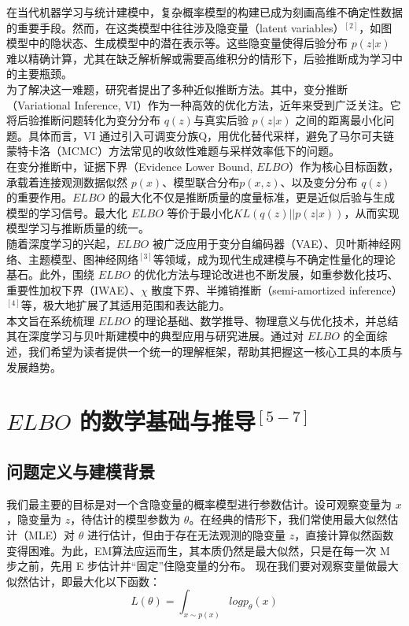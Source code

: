 \documentclass[final]{ws-ijseke}
\begin{document}
\hspace*{2em} 在当代机器学习与统计建模中，复杂概率模型的构建已成为刻画高维不确定性数据的重要手段。然而，在这类模型中往往涉及隐变量（latent variables）$^{[2]}$，如图模型中的隐状态、生成模型中的潜在表示等。这些隐变量使得后验分布 $p(z|x)$ 难以精确计算，尤其在缺乏解析解或需要高维积分的情形下，后验推断成为学习中的主要瓶颈。\\
\hspace*{2em} 为了解决这一难题，研究者提出了多种近似推断方法。其中，变分推断（Variational Inference, VI）作为一种高效的优化方法，近年来受到广泛关注。它将后验推断问题转化为变分分布 $q(z)$与真实后验 $p(z|x)$ 之间的距离最小化问题。具体而言，VI 通过引入可调变分族Q，用优化替代采样，避免了马尔可夫链蒙特卡洛（MCMC）方法常见的收敛性难题与采样效率低下的问题。\\
在变分推断中，证据下界（Evidence Lower Bound, $ELBO$）作为核心目标函数，承载着连接观测数据似然 $p(x)$、模型联合分布$p(x,z)$、以及变分分布 $q(z)$ 的重要作用。$ELBO$ 的最大化不仅是推断质量的度量标准，更是近似后验与生成模型的学习信号。最大化 $ELBO$ 等价于最小化$KL(q(z)||p(z|x))$，从而实现模型学习与推断质量的统一。\\
\hspace*{2em} 随着深度学习的兴起，$ELBO$ 被广泛应用于变分自编码器（VAE）、贝叶斯神经网络、主题模型、图神经网络$^{[3]}$等领域，成为现代生成建模与不确定性量化的理论基石。此外，围绕 $ELBO$ 的优化方法与理论改进也不断发展，如重参数化技巧、重要性加权下界（IWAE）、$\chi$ 散度下界、半摊销推断（semi-amortized inference）$^{[4]}$等，极大地扩展了其适用范围和表达能力。\\
\hspace*{2em} 本文旨在系统梳理 $ELBO$ 的理论基础、数学推导、物理意义与优化技术，并总结其在深度学习与贝叶斯建模中的典型应用与研究进展。通过对 $ELBO$ 的全面综述，我们希望为读者提供一个统一的理解框架，帮助其把握这一核心工具的本质与发展趋势。

\section{$ELBO$ 的数学基础与推导$^{[5-7]}$ \label{sec1}}
\subsection{问题定义与建模背景}

\hspace*{2em}我们最主要的目标是对一个含隐变量的概率模型进行参数估计。设可观察变量为 $x$，隐变量为 $z$，待估计的模型参数为 $\theta$。在经典的情形下，我们常使用最大似然估计（MLE）对 $\theta$ 进行估计，但由于存在无法观测的隐变量 $z$，直接计算似然函数变得困难。为此，EM算法应运而生，其本质仍然是最大似然，只是在每一次 M 步之前，先用 E 步估计并“固定”住隐变量的分布。
现在我们要对观察变量做最大似然估计，即最大化以下函数：
\begin{equation*}
L(\theta) = \int_{x\sim p(x)}{logp_\theta(x)}
\end{equation*}
\end{document}
